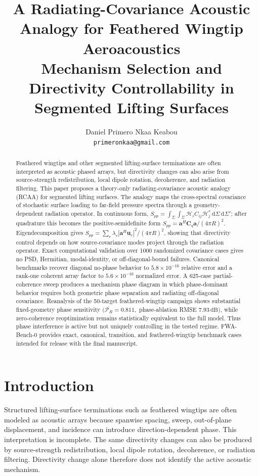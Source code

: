 \documentclass[11pt]{article}
\title{
    \textbf{A Radiating-Covariance Acoustic Analogy for Feathered Wingtip Aeroacoustics}\\
    \large Mechanism Selection and Directivity Controllability in Segmented Lifting Surfaces
}
\author{
    Daniel Primero Nkaa Keabou\\
    \texttt{primeronkaa@gmail.com}
}
\date{}
\newcommand{\vect}[1]{\bm{#1}}
\newcommand{\mat}[1]{\bm{#1}}
\begin{document}
\maketitle

\begin{abstract}
Feathered wingtips and other segmented lifting-surface terminations are often interpreted as acoustic phased arrays, but directivity changes can also arise from source-strength redistribution, local dipole rotation, decoherence, and radiation filtering. This paper proposes a theory-only radiating-covariance acoustic analogy (RCAA) for segmented lifting surfaces. The analogy maps the cross-spectral covariance of stochastic surface loading to far-field pressure spectra through a geometry-dependent radiation operator. In continuous form, \(S_{pp}=\int_{\Sigma}\int_{\Sigma}\mathcal H_i C_{ij}\mathcal H_j^*\,\mathrm d\Sigma\,\mathrm d\Sigma'\); after quadrature this becomes the positive-semidefinite form \(S_{pp}=\vect{a}^{H}\mat{C}_q\vect{a}/(4\pi R)^2\). Eigendecomposition gives \(S_{pp}=\sum_r \lambda_r|\vect{a}^{H}\vect{u}_r|^2/(4\pi R)^2\), showing that directivity control depends on how source-covariance modes project through the radiation operator. Exact computational validation over 1000 randomized covariance cases gives no PSD, Hermitian, modal-identity, or off-diagonal-bound failures. Canonical benchmarks recover diagonal no-phase behavior to \(5.8\times10^{-16}\) relative error and a rank-one coherent array factor to \(5.6\times10^{-16}\) normalized error. A 625-case partial-coherence sweep produces a mechanism phase diagram in which phase-dominant behavior requires both geometric phase separation and radiating off-diagonal covariance. Reanalysis of the 50-target feathered-wingtip campaign shows substantial fixed-geometry phase sensitivity \((\overline{\mathcal P_R}=0.811,\) phase-ablation RMSE \(7.93\,\mathrm{dB})\), while zero-coherence reoptimization remains statistically equivalent to the full model. Thus phase interference is active but not uniquely controlling in the tested regime. FWA-Bench-0 provides exact, canonical, transition, and feathered-wingtip benchmark cases intended for release with the final manuscript.
\end{abstract}

\section{Introduction}

Structured lifting-surface terminations such as feathered wingtips are often modeled as acoustic arrays because spanwise spacing, sweep, out-of-plane displacement, and incidence can introduce direction-dependent phase. This interpretation is incomplete. The same directivity changes can also be produced by source-strength redistribution, local dipole rotation, decoherence, or radiation filtering. Directivity change alone therefore does not identify the active acoustic mechanism.
\end{document}
